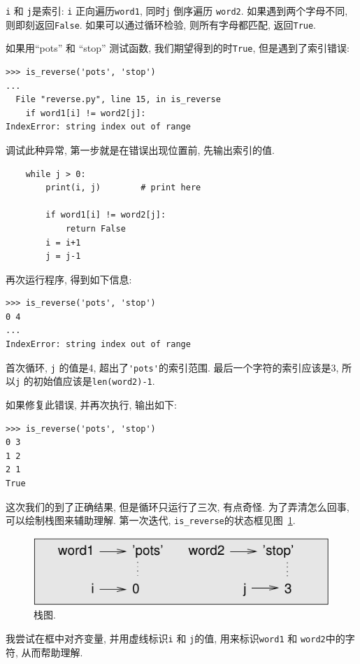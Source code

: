 \documentclass[10pt]{book}
\begin{document}
{\tt i} 和 {\tt j}是索引: {\tt i} 正向遍历{\tt word1}, 同时{\tt j} 倒序遍历
{\tt word2}. 如果遇到两个字母不同, 则即刻返回{\tt False}. 
如果可以通过循环检验, 则所有字母都匹配, 返回{\tt True}. 

如果用``pots'' 和 ``stop'' 测试函数, 我们期望得到的时{\tt True}, 
但是遇到了索引错误:

\begin{verbatim}
>>> is_reverse('pots', 'stop')
...
  File "reverse.py", line 15, in is_reverse
    if word1[i] != word2[j]:
IndexError: string index out of range
\end{verbatim}
%
调试此种异常, 第一步就是在错误出现位置前, 先输出索引的值. 

\begin{verbatim}
    while j > 0:
        print(i, j)        # print here
        
        if word1[i] != word2[j]:
            return False
        i = i+1
        j = j-1
\end{verbatim}
%
再次运行程序, 得到如下信息:

\begin{verbatim}
>>> is_reverse('pots', 'stop')
0 4
...
IndexError: string index out of range
\end{verbatim}
%
首次循环,  {\tt j} 的值是4,
超出了\verb"'pots'"的索引范围. 
最后一个字符的索引应该是3,
所以{\tt j} 的初始值应该是{\tt len(word2)-1}.

如果修复此错误, 并再次执行, 输出如下:

\begin{verbatim}
>>> is_reverse('pots', 'stop')
0 3
1 2
2 1
True
\end{verbatim}
%
这次我们的到了正确结果, 但是循环只运行了三次, 有点奇怪. 
为了弄清怎么回事, 可以绘制栈图来辅助理解. 
第一次迭代, \verb"is_reverse"的状态框见图~\ref{fig.state4}.  
 

\begin{figure}
\centerline
{\includegraphics[scale=0.8]{figs/state4.pdf}}
\caption{栈图.}
\label{fig.state4}
\end{figure}

我尝试在框中对齐变量, 并用虚线标识{\tt i} 和
{\tt j}的值, 用来标识{\tt word1} 和 {\tt word2}中的字符, 
从而帮助理解. 
\end{document}
